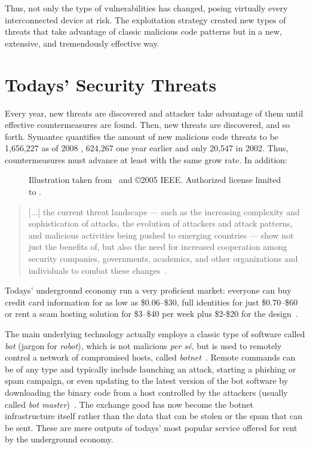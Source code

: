 Thus, not only the type of vulnerabilities has changed, posing virtually every interconnected device at risk. The exploitation strategy created new types of threats that take advantage of classic malicious code patterns but in a new, extensive, and tremendously effective way.

\section{Todays' Security Threats}
\label{introduction:motivation} Every year, new threats are discovered and attacker take advantage of them until effective countermeasures are found. Then, new threats are discovered, and so forth. \textsf{Symantec} quantifies the amount of new malicious code threats to be 1,656,227 as of 2008 \citep{symantec_threat_report_2009}, 624,267 one year earlier and only 20,547 in 2002. Thus, countermeasures must advance at least with the same grow rate. In addition:

\begin{figure}[t]
  \centering
  \caption{Illustration taken from~\citep{holz} and \copyright 2005 IEEE. Authorized license limited to \institution.}
  \label{fig:bots}
\end{figure}

\begin{quotation}
  [...] the current threat landscape --- such as the increasing complexity and sophistication of attacks, the evolution of attackers
and attack patterns, and malicious activities being pushed to emerging countries --- show not just the benefits of, but also the need for increased cooperation among security companies, governments, academics, and other organizations and individuals to combat these changes~\citep{symantec_threat_report_2009}.
\end{quotation}

Todays' underground economy run a very proficient market: everyone can buy credit card information for as low as \$0.06--\$30, full identities for just \$0.70--\$60 or rent a scam hosting solution for \$3--\$40 per week plus \$2-\$20 for the design~\citep{symantec_threat_report_2009}.

The main underlying technology actually employs a classic type of software called \emph{bot} (jargon for \emph{robot}), which is not malicious \emph{per s\'e}, but is used to remotely control a network of compromised hosts, called \emph{botnet}~\citep{holz}. Remote commands can be of any type and typically include launching an attack, starting a phishing or spam campaign, or even updating to the latest version of the bot software by downloading the binary code from a host controlled by the attackers (usually called \emph{bot master})~\citep{torpig}. The exchange good has now become the botnet infrastructure itself rather than the data that can be stolen or the spam that can be sent. These are mere outputs of todays' most popular service offered for rent by the underground economy.

